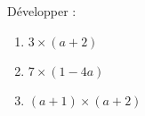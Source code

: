 
\begin{mental}
    Développer :
    \begin{enumerate}
        \item
            \( 3\times (a+2)\)
        \item
            \( 7\times (1-4a)\)
        \item
            \( (a+1)\times (a+2)\)
    \end{enumerate}
\end{mental}
